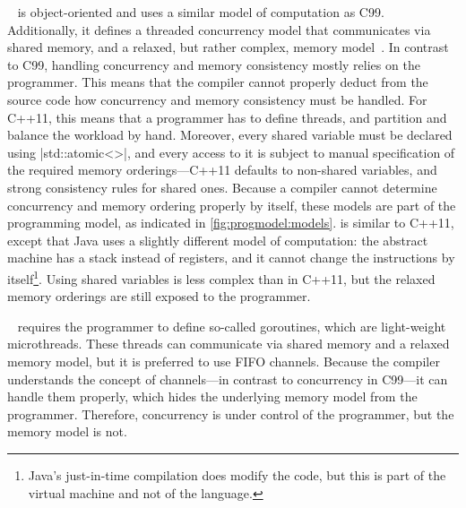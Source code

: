 ~\cite{C++11} is object-oriented and uses a similar model of computation as C99.
Additionally, it defines a threaded concurrency model that communicates via shared memory, and a relaxed, but rather complex, memory model~\cite{batty:math_cpp_concurrency}.
In contrast to C99, handling concurrency and memory consistency mostly relies on the programmer.
This means that the compiler cannot properly deduct from the source code how concurrency and memory consistency must be handled.
For C++11, this means that a programmer has to define threads, and partition and balance the workload by hand.
Moreover, every shared variable must be declared using \lsticode|std::atomic<>|, and every access to it is subject to manual specification of the required memory orderings---C++11 defaults to non-shared variables, and strong consistency rules for shared ones.
Because a compiler cannot determine concurrency and memory ordering properly by itself, these models are part of the programming model, as indicated in \vref{fig:progmodel:models}.
 is similar to C++11, except that Java uses a slightly different model of computation: the abstract machine has a stack instead of registers, and it cannot change the instructions by itself\footnote{
	Java's just-in-time compilation does modify the code, but this is part of the virtual machine and not of the language.
}.
Using shared variables is less complex than in C++11, but the relaxed memory orderings are still exposed to the programmer.

~\cite{go} requires the programmer to define so-called goroutines, which are light-weight microthreads.
These threads can communicate via shared memory and a relaxed memory model, but it is preferred to use \ac{FIFO} channels.
Because the compiler understands the concept of channels---in contrast to concurrency in C99---it can handle them properly, which hides the underlying memory model from the programmer.
Therefore, concurrency is under control of the programmer, but the memory model is not.


